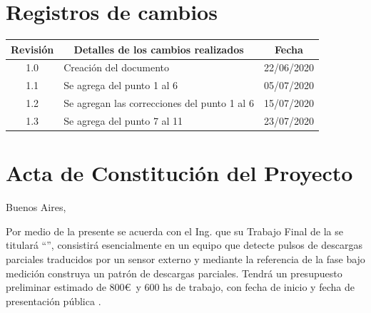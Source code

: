 \documentclass[11pt]{charter}
\begin{document}
\maketitle
\thispagestyle{empty}
\pagebreak


\thispagestyle{empty}
{\setlength{\parskip}{0pt}
\tableofcontents{}
}
\pagebreak


\section{Registros de cambios}
\label{sec:registro}


\begin{table}[ht]
\label{tab:registro}
\centering

\begin{tabularx}{\linewidth}{@{}|c|X|c|@{}}
\hline
\rowcolor[HTML]{C0C0C0} 
Revisión & \multicolumn{1}{c|}{\cellcolor[HTML]{C0C0C0}Detalles de los cambios realizados} & Fecha      \\ \hline
1.0      & 	Creación del documento     							& 22/06/2020 \\ \hline
1.1      & 	Se agrega del punto 1 al 6	 						& 05/07/2020 \\ \hline
1.2      & 	Se agregan las correcciones del punto 1 al 6		& 15/07/2020 \\ \hline
1.3      & 	Se agrega del punto 7 al 11							& 23/07/2020 \\ \hline
\end{tabularx}
\end{table}

\pagebreak



\section{Acta de Constitución del Proyecto}
\label{sec:acta}

\begin{flushright}
Buenos Aires, \fechaInicioName
\end{flushright}

\vspace{2 cm}

Por medio de la presente se acuerda con el Ing. \authorname\hspace{1px} que su Trabajo Final de la \degreename\hspace{1px} se titulará ``\ttitle'', consistirá esencialmente en un equipo que detecte pulsos de descargas parciales traducidos por un sensor externo y mediante la referencia de la fase bajo medición construya un patrón de descargas parciales. Tendrá un presupuesto preliminar estimado de 800\euro\ y 600 hs de trabajo, con fecha de inicio \fechaInicioName\hspace{1px} y fecha de presentación pública \fechaFinalName.
\end{document}
